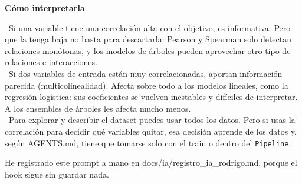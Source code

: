 \documentclass[11pt,a4paper]{article}
\begin{document}
{\textbf{Cómo interpretarla}

\hspace*{1.0em}\textbullet~Si una variable tiene una correlación alta con el objetivo, es informativa. Pero que la tenga baja no basta para descartarla: Pearson y Spearman solo detectan relaciones monótonas, y los modelos de árboles pueden aprovechar otro tipo de relaciones e interacciones. \\{}
\hspace*{1.0em}\textbullet~Si dos variables de entrada están muy correlacionadas, aportan información parecida (multicolinealidad). Afecta sobre todo a los modelos lineales, como la regresión logística: sus coeficientes se vuelven inestables y difíciles de interpretar. A los ensembles de árboles les afecta mucho menos. \\{}
\hspace*{1.0em}\textbullet~Para explorar y describir el dataset puedes usar todos los datos. Pero si usas la correlación para decidir qué variables quitar, esa decisión aprende de los datos y, según AGENTS.md, tiene que tomarse solo con el train o dentro del \texttt{Pipeline}.

He registrado este prompt a mano en docs/\allowbreak{}ia/\allowbreak{}registro\_\allowbreak{}ia\_\allowbreak{}rodrigo.md, porque el hook sigue sin guardar nada.

}
\end{document}
